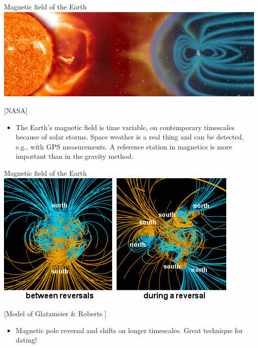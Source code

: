     \begin{frame}
      \begin{PointSix}{Magnetic field of the Earth}
        \includegraphics[width=0.99\linewidth]{Figures/Magnetics/SolarStorms.png}

        \tiny [NASA]
        \small
        \begin{itemize}
          \item The Earth's magnetic field is time variable, on contemporary timescales because of solar storms. Space weather is a real thing and can be detected, e.g., with GPS measurements. A reference station in magnetics is more important than in the gravity method.
        \end{itemize}
      \end{PointSix}
    \end{frame}

    \begin{frame}
      \begin{PointSix}{Magnetic field of the Earth}
        \includegraphics[width=0.99\linewidth]{Figures/Magnetics/NASA_54559main_comparison1_strip.png}

        \tiny [Model of Glatzmeier \& Roberts ]
        \small
        \begin{itemize}
          \item Magnetic pole reversal and shifts on longer timescales. Great technique for dating!
        \end{itemize}
      \end{PointSix}
    \end{frame}
  
